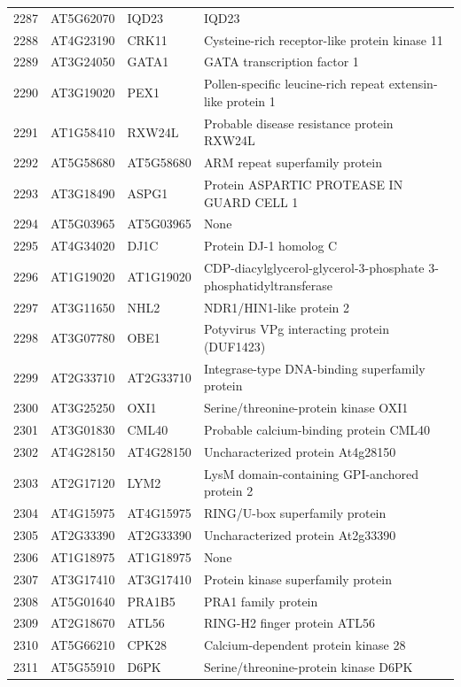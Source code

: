 \documentclass[11pt]{article}
\begin{document}
\begin{center}
\begin{tabular}{rlll}
2287 & AT5G62070 & IQD23 & IQD23\\
2288 & AT4G23190 & CRK11 & Cysteine-rich receptor-like protein kinase 11\\
2289 & AT3G24050 & GATA1 & GATA transcription factor 1\\
2290 & AT3G19020 & PEX1 & Pollen-specific leucine-rich repeat extensin-like protein 1\\
2291 & AT1G58410 & RXW24L & Probable disease resistance protein RXW24L\\
2292 & AT5G58680 & AT5G58680 & ARM repeat superfamily protein\\
2293 & AT3G18490 & ASPG1 & Protein ASPARTIC PROTEASE IN GUARD CELL 1\\
2294 & AT5G03965 & AT5G03965 & None\\
2295 & AT4G34020 & DJ1C & Protein DJ-1 homolog C\\
2296 & AT1G19020 & AT1G19020 & CDP-diacylglycerol-glycerol-3-phosphate 3-phosphatidyltransferase\\
2297 & AT3G11650 & NHL2 & NDR1/HIN1-like protein 2\\
2298 & AT3G07780 & OBE1 & Potyvirus VPg interacting protein (DUF1423)\\
2299 & AT2G33710 & AT2G33710 & Integrase-type DNA-binding superfamily protein\\
2300 & AT3G25250 & OXI1 & Serine/threonine-protein kinase OXI1\\
2301 & AT3G01830 & CML40 & Probable calcium-binding protein CML40\\
2302 & AT4G28150 & AT4G28150 & Uncharacterized protein At4g28150\\
2303 & AT2G17120 & LYM2 & LysM domain-containing GPI-anchored protein 2\\
2304 & AT4G15975 & AT4G15975 & RING/U-box superfamily protein\\
2305 & AT2G33390 & AT2G33390 & Uncharacterized protein At2g33390\\
2306 & AT1G18975 & AT1G18975 & None\\
2307 & AT3G17410 & AT3G17410 & Protein kinase superfamily protein\\
2308 & AT5G01640 & PRA1B5 & PRA1 family protein\\
2309 & AT2G18670 & ATL56 & RING-H2 finger protein ATL56\\
2310 & AT5G66210 & CPK28 & Calcium-dependent protein kinase 28\\
2311 & AT5G55910 & D6PK & Serine/threonine-protein kinase D6PK\\

\end{tabular}
\end{center}
\end{document}
